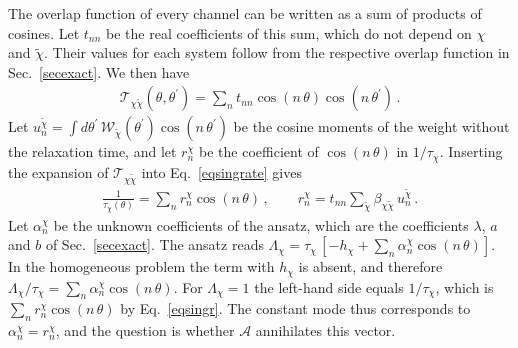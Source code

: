 \documentclass[aps,prb,onecolumn,nofootinbib,citeautoscript,10pt]{revtex4-2}
\begin{document}
The overlap function of every channel can be written as a sum of products of cosines. Let $t_{nn}$ be the real coefficients of this sum, which do not depend on $\chi$ and $\tilde\chi$. Their values for each system follow from the respective overlap function in Sec.~\ref{secexact}. We then have
\begin{align}
\mathcal T_{\chi\tilde\chi}(\theta,\theta^\prime)=\sum_n t_{nn}\cos(n\,\theta)\cos(n\,\theta^\prime)\,.
\end{align}
Let $u^{\tilde\chi}_n=\int d\theta^\prime\,\mathcal W_{\tilde\chi}(\theta^\prime)\cos(n\,\theta^\prime)$ be the cosine moments of the weight without the relaxation time, and let $r^\chi_n$ be the coefficient of $\cos(n\,\theta)$ in $1/\tau_\chi$. Inserting the expansion of $\mathcal T_{\chi\tilde\chi}$ into Eq.~\eqref{eqsingrate} gives
\begin{align}
\frac{1}{\tau_\chi(\theta)}=\sum_n r^\chi_n\cos(n\,\theta)\,,\qquad r^\chi_n=t_{nn}\sum_{\tilde\chi}\beta_{\chi\tilde\chi}\,u^{\tilde\chi}_n\,.
\label{eqsingr}
\end{align}
Let $\alpha^\chi_n$ be the unknown coefficients of the ansatz, which are the coefficients $\lambda$, $a$ and $b$ of Sec.~\ref{secexact}. The ansatz reads $\Lambda_\chi=\tau_\chi\,[-h_\chi+\sum_n\alpha^\chi_n\cos(n\,\theta)]$. In the homogeneous problem the term with $h_\chi$ is absent, and therefore $\Lambda_\chi/\tau_\chi=\sum_n\alpha^\chi_n\cos(n\,\theta)$. For $\Lambda_\chi=1$ the left-hand side equals $1/\tau_\chi$, which is $\sum_n r^\chi_n\cos(n\,\theta)$ by Eq.~\eqref{eqsingr}. The constant mode thus corresponds to $\alpha^\chi_n=r^\chi_n$, and the question is whether $\mathcal A$ annihilates this vector.
\end{document}
